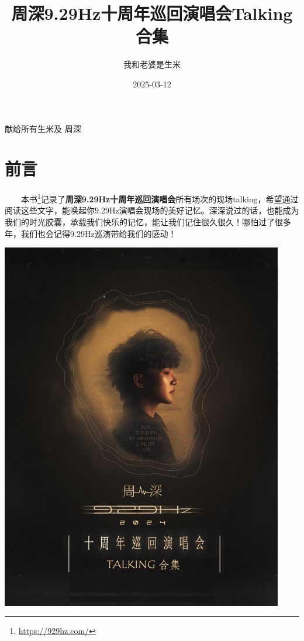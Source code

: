 \documentclass[]{ctexbook}
\title{周深9.29Hz十周年巡回演唱会Talking合集}
\author{我和老婆是生米}
\date{2025-03-12}
\renewcommand{\href}[2]{#2\footnote{\url{#1}}}
\begin{document}
\maketitle


\thispagestyle{empty}

\begin{center}
献给所有生米及
          周深
\end{center}

\setlength{\abovedisplayskip}{-5pt}
\setlength{\abovedisplayshortskip}{-5pt}

\mainmatter

{
\setcounter{tocdepth}{2}
\tableofcontents
}
\listoftables
\listoffigures
\chapter*{前言}\label{ux524dux8a00}


  \href{https://929hz.com/}{本书}记录了\textbf{周深9.29Hz十周年巡回演唱会}所有场次的现场talking，希望通过阅读这些文字，能唤起你9.29Hz演唱会现场的美好记忆。深深说过的话，也能成为我们的时光胶囊，承载我们快乐的记忆，能让我们记住很久很久！哪怕过了很多年，我们也会记得9.29Hz巡演带给我们的感动！

\begin{center}\includegraphics[width=350pt]{img/book-cover} \end{center}
\end{document}
